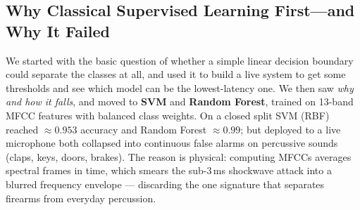 \documentclass[conference]{IEEEtran}
\begin{document}
\subsection{Why Classical Supervised Learning First---and Why It Failed}
\label{sec:classical}
We started with the basic question of whether a simple linear decision boundary could separate the classes
at all, and used it to build a live system to get some thresholds and see which model can be the
lowest-latency one. We then saw \textit{why and how it falls}, and moved to \textbf{SVM} and \textbf{Random
Forest}, trained on 13-band MFCC features with balanced class weights. On a closed split SVM (RBF) reached
$\approx 0.953$ accuracy and Random Forest $\approx 0.99$; but deployed to a live microphone both collapsed
into continuous false alarms on percussive sounds (claps, keys, doors, brakes). The reason is physical:
computing MFCCs averages spectral frames in time, which smears the sub-3\,ms shockwave attack into a blurred
frequency envelope --- discarding the one signature that separates firearms from everyday percussion.
\end{document}
